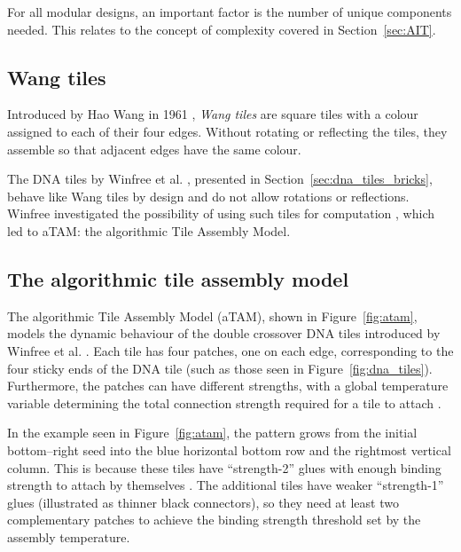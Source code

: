 For all modular designs, an important factor is the number of unique components needed. This relates to the concept of complexity covered in Section~\ref{sec:AIT}.

\subsection{Wang tiles}
Introduced by Hao Wang in 1961 \cite{wang1961proving}, \emph{Wang tiles} are square tiles with a colour assigned to each of their four edges. Without rotating or reflecting the tiles, they assemble so that adjacent edges have the same colour.


The DNA tiles by Winfree et al. \cite{winfree1998design}, presented in Section~\ref{sec:dna_tiles_bricks}, behave like Wang tiles by design and do not allow rotations or reflections. Winfree investigated the possibility of using such tiles for computation \cite{winfree1998algorithmic}, which led to aTAM: the algorithmic Tile Assembly Model.

\subsection{The algorithmic tile assembly model}
\label{sec:atam}


The algorithmic Tile Assembly Model (aTAM), shown in Figure~\ref{fig:atam}, models the dynamic behaviour of the double crossover DNA tiles introduced by Winfree et al. \cite{winfree1998design}. Each tile has four patches, one on each edge, corresponding to the four sticky ends of the DNA tile (such as those seen in Figure~\ref{fig:dna_tiles}). Furthermore, the patches can have different strengths, with a global temperature variable determining the total connection strength required for a tile to attach \cite{doty2012theory}.

In the example seen in Figure~\ref{fig:atam}, the pattern grows from the initial bottom--right seed into the blue horizontal bottom row and the rightmost vertical column. This is because these tiles have ``strength-2'' glues with enough binding strength to attach by themselves \cite{doty2012theory}. The additional tiles have weaker ``strength-1'' glues (illustrated as thinner black connectors), so they need at least two complementary patches to achieve the binding strength threshold set by the assembly temperature.

